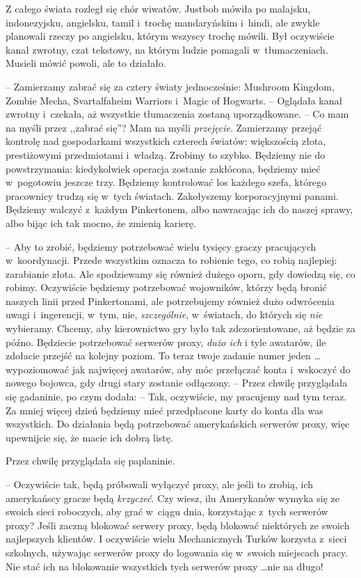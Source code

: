\documentclass[oneside,polish,11pt,rmheadings]{mwbk}
\begin{document}
Z całego świata rozległ się chór wiwatów. Justbob mówiła po malajsku, indonezyjsku, angielsku, tamil i~trochę mandaryńskim i~hindi, ale zwykle planowali rzeczy po angielsku, którym wszyscy trochę mówili. Był oczywiście kanał zwrotny, czat tekstowy, na którym ludzie pomagali w~tłumaczeniach. Musieli mówić powoli, ale to działało.

-- Zamierzamy zabrać się za cztery światy jednocześnie: Mushroom Kingdom, Zombie Mecha, Svartalfaheim Warriors i~Magic of Hogwarts. -- Oglądała kanał zwrotny i~czekała, aż wszystkie tłumaczenia zostaną uporządkowane. -- Co mam na myśli przez ,,zabrać się''? Mam na myśli \textit{przejęcie}. Zamierzamy przejąć kontrolę nad gospodarkami wszystkich czterech światów: większością złota, prestiżowymi przedmiotami i~władzą. Zrobimy to szybko. Będziemy nie do powstrzymania: kiedykolwiek operacja zostanie zakłócona, będziemy mieć w~pogotowiu jeszcze trzy. Będziemy kontrolować los każdego szefa, którego pracownicy trudzą się w~tych światach. Zakołyszemy korporacyjnymi panami. Będziemy walczyć z~każdym Pinkertonem, albo nawracając ich do naszej sprawy, albo bijąc ich tak mocno, że zmienią karierę.

-- Aby to zrobić, będziemy potrzebować wielu tysięcy graczy pracujących w~koordynacji. Przede wszystkim oznacza to robienie tego, co robią najlepiej: zarabianie złota. Ale spodziewamy się również dużego oporu, gdy dowiedzą się, co robimy. Oczywiście będziemy potrzebować wojowników, którzy będą bronić naszych linii przed Pinkertonami, ale potrzebujemy również dużo odwrócenia uwagi i~ingerencji, w~tym, nie, \textit{szczególnie}, w~światach, do których się \textit{nie }wybieramy. Chcemy, aby kierownictwo gry było tak zdezorientowane, aż będzie za późno. Będziecie potrzebować serwerów proxy, \textit{dużo ich }i tyle awatarów, ile zdołacie przejść na kolejny poziom. To teraz twoje zadanie numer jeden  \ldots  wypoziomować jak najwięcej awatarów, aby móc przełączać konta i~wskoczyć do nowego bojowca, gdy drugi stary zostanie odłączony. -- Przez chwilę przyglądała się gadaninie, po czym dodała: -- Tak, oczywiście, my pracujemy nad tym teraz. Za mniej więcej dzień będziemy mieć przedpłacone karty do konta dla was wszystkich. Do działania będą potrzebować amerykańskich serwerów proxy, więc upewnijcie się, że macie ich dobrą listę.

Przez chwilę przyglądała się paplaninie. 

-- Oczywiście tak, będą próbowali wyłączyć proxy, ale jeśli to zrobią, ich amerykańscy gracze będą \textit{krzyczeć}. Czy wiesz, ilu Amerykanów wymyka się ze swoich sieci roboczych, aby grać w~ciągu dnia, korzystając z~tych serwerów proxy? Jeśli zaczną blokować serwery proxy, będą blokować niektórych ze swoich najlepszych klientów. I oczywiście wielu Mechanicznych Turków korzysta z~sieci szkolnych, używając serwerów proxy do logowania się w~swoich miejscach pracy. Nie stać ich na blokowanie wszystkich tych serwerów proxy \ldots  nie na długo! 
\end{document}
